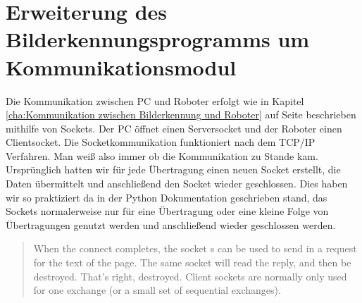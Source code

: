 \section{Erweiterung des Bilderkennungsprogramms um Kommunikationsmodul}
Die Kommunikation zwischen PC und Roboter erfolgt wie in Kapitel \ref{cha:Kommunikation zwischen Bilderkennung und Roboter} auf Seite \pageref{cha:Kommunikation zwischen Bilderkennung und Roboter} beschrieben mithilfe von Sockets. Der PC öffnet einen Serversocket und der Roboter einen Clientsocket. Die Socketkommunikation funktioniert nach dem TCP/IP Verfahren. Man weiß also immer ob die Kommunikation zu Stande kam.
Ursprünglich hatten wir für jede Übertragung einen neuen Socket erstellt, die Daten übermittelt und anschließend den Socket wieder geschlossen. Dies haben wir so praktiziert da in der Python Dokumentation geschrieben stand, das Sockets normalerweise nur für eine Übertragung oder eine kleine Folge von Übertragungen genutzt werden und anschließend wieder geschlossen werden.
\begin{quote}
When the connect completes, the socket s can be used to send in a request for the text of the page. The same socket will read the reply, and then be destroyed. That’s right, destroyed. Client sockets are normally only used for one exchange (or a small set of sequential exchanges).\cite{Python-Doku}
\end{quote}
